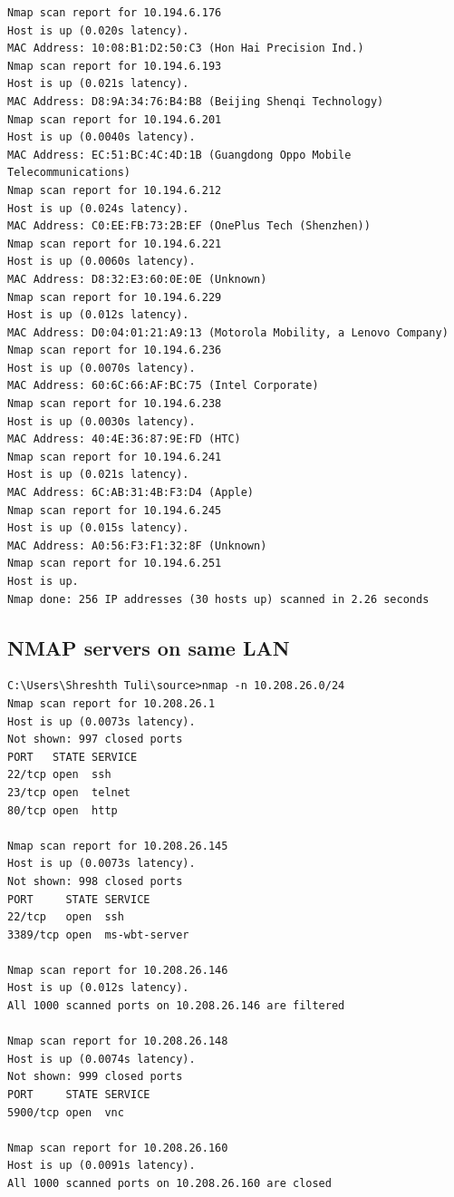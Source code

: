 \documentclass[a4paper, 11pt]{article}
\begin{document}
\begin{appendices}
\begin{lstlisting}[style=BashInputStyle]
Nmap scan report for 10.194.6.176
Host is up (0.020s latency).
MAC Address: 10:08:B1:D2:50:C3 (Hon Hai Precision Ind.)
Nmap scan report for 10.194.6.193
Host is up (0.021s latency).
MAC Address: D8:9A:34:76:B4:B8 (Beijing Shenqi Technology)
Nmap scan report for 10.194.6.201
Host is up (0.0040s latency).
MAC Address: EC:51:BC:4C:4D:1B (Guangdong Oppo Mobile Telecommunications)
Nmap scan report for 10.194.6.212
Host is up (0.024s latency).
MAC Address: C0:EE:FB:73:2B:EF (OnePlus Tech (Shenzhen))
Nmap scan report for 10.194.6.221
Host is up (0.0060s latency).
MAC Address: D8:32:E3:60:0E:0E (Unknown)
Nmap scan report for 10.194.6.229
Host is up (0.012s latency).
MAC Address: D0:04:01:21:A9:13 (Motorola Mobility, a Lenovo Company)
Nmap scan report for 10.194.6.236
Host is up (0.0070s latency).
MAC Address: 60:6C:66:AF:BC:75 (Intel Corporate)
Nmap scan report for 10.194.6.238
Host is up (0.0030s latency).
MAC Address: 40:4E:36:87:9E:FD (HTC)
Nmap scan report for 10.194.6.241
Host is up (0.021s latency).
MAC Address: 6C:AB:31:4B:F3:D4 (Apple)
Nmap scan report for 10.194.6.245
Host is up (0.015s latency).
MAC Address: A0:56:F3:F1:32:8F (Unknown)
Nmap scan report for 10.194.6.251
Host is up.
Nmap done: 256 IP addresses (30 hosts up) scanned in 2.26 seconds
\end{lstlisting}  


\subsection{NMAP servers on same LAN}
\label{appendix:nmap_local_servers}

\begin{lstlisting}[style=BashInputStyle]
C:\Users\Shreshth Tuli\source>nmap -n 10.208.26.0/24
Nmap scan report for 10.208.26.1
Host is up (0.0073s latency).
Not shown: 997 closed ports
PORT   STATE SERVICE
22/tcp open  ssh
23/tcp open  telnet
80/tcp open  http

Nmap scan report for 10.208.26.145
Host is up (0.0073s latency).
Not shown: 998 closed ports
PORT     STATE SERVICE
22/tcp   open  ssh
3389/tcp open  ms-wbt-server

Nmap scan report for 10.208.26.146
Host is up (0.012s latency).
All 1000 scanned ports on 10.208.26.146 are filtered

Nmap scan report for 10.208.26.148
Host is up (0.0074s latency).
Not shown: 999 closed ports
PORT     STATE SERVICE
5900/tcp open  vnc

Nmap scan report for 10.208.26.160
Host is up (0.0091s latency).
All 1000 scanned ports on 10.208.26.160 are closed


\end{lstlisting}
\end{appendices}
\end{document}
